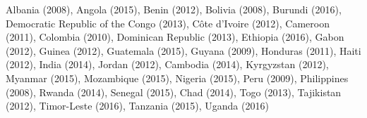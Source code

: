 Albania (2008), Angola (2015), Benin (2012), Bolivia (2008), Burundi (2016), Democratic Republic of the Congo (2013), Côte d'Ivoire (2012), Cameroon (2011), Colombia (2010), Dominican Republic (2013), Ethiopia (2016), Gabon (2012), Guinea (2012), Guatemala (2015), Guyana (2009), Honduras (2011), Haiti (2012), India (2014), Jordan (2012), Cambodia (2014), Kyrgyzstan (2012), Myanmar (2015), Mozambique (2015), Nigeria (2015), Peru (2009), Philippines (2008), Rwanda (2014), Senegal (2015), Chad (2014), Togo (2013), Tajikistan (2012), Timor-Leste (2016), Tanzania (2015), Uganda (2016)